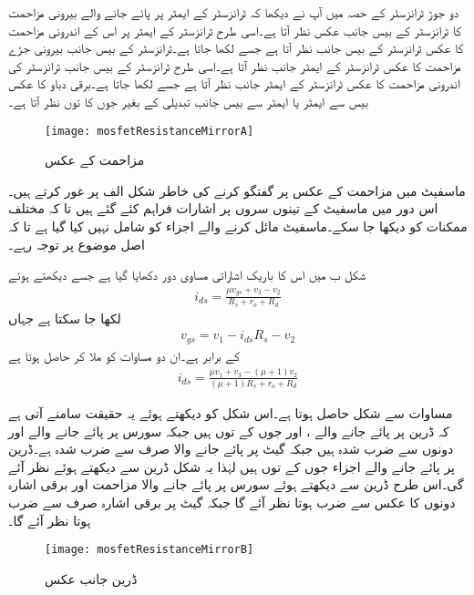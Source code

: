 دو جوڑ ٹرانزسٹر کے حصہ  میں آپ نے دیکھا کہ ٹرانزسٹر کے ایمٹر پر پائے جانے والے بیرونی مزاحمت  کا ٹرانزسٹر کے بیس جانب عکس  نظر آتا ہے۔اسی طرح ٹرانزسٹر کے ایمٹر پر اس کے اندرونی مزاحمت  کا عکس ٹرانزسٹر کے بیس جانب  نظر آتا ہے جسے  لکھا جاتا ہے۔ٹرانزسٹر کے بیس جانب بیرونی جڑے مزاحمت  کا عکس ٹرانزسٹر کے ایمٹر جانب  نظر آتا ہے۔اسی طرح ٹرانزسٹر کے بیس جانب ٹرانزسٹر کی اندرونی مزاحمت  کا عکس ٹرانزسٹر کے ایمٹر  جانب  نظر آتا ہے جسے  لکھا جاتا ہے۔برقی دباو کا عکس بیس سے ایمٹر یا ایمٹر سے بیس جانب تبدیلی کے بغیر جوں کا توں نظر آتا ہے۔
\begin{figure}
\centering
\texttt{[image: mosfetResistanceMirrorA]}
\caption{مزاحمت کے عکس}
\label{شکل_ماسفیٹ_مزاحمت_کے_عکس}
\end{figure}

ماسفیٹ میں مزاحمت کے عکس پر گفتگو کرنے کی خاطر شکل  الف پر غور کرتے ہیں۔اس دور میں ماسفیٹ کے تینوں سروں پر اشارات فراہم کئے گئے ہیں تا کہ مختلف ممکنات کو دیکھا جا سکے۔ماسفیٹ مائل کرنے والے اجزاء کو شامل نہیں کیا گیا ہے تا کہ اصل موضوع پر توجہ رہے۔

شکل  ب میں اس کا باریک اشاراتی مساوی دور دکھایا گیا ہے جسے دیکھتے ہوئے
\begin{align*}
i_{ds}=\frac{\mu v_{gs}+v_3-v_2}{R_s+r_o+R_d}
\end{align*}
لکھا جا سکتا ہے جہاں
\begin{align*}
v_{gs}=v_1-i_{ds} R_s-v_2
\end{align*}
کے برابر ہے۔ان دو مساوات کو ملا کر حاصل ہوتا ہے
\begin{align}\label{مساوات_ماسفیٹ_محاصل_عکس}
i_{ds}=\frac{\mu v_1+v_3-\left(\mu+1 \right) v_2}{\left(\mu+1 \right) R_s+r_o+R_d}
\end{align}

مساوات  سے شکل  حاصل ہوتا ہے۔اس شکل کو دیکھتے ہوئے یہ حقیقت سامنے آتی ہے کہ ڈرین پر پائے جانے والے  ،  اور  جوں کے توں ہیں جبکہ سورس پر پائے جانے والے  اور  دونوں   سے ضرب شدہ ہیں جبکہ گیٹ پر پائے جانے والا  صرف  سے ضرب شدہ ہے۔ڈرین پر پائے جانے والے اجزاء جوں کے توں ہیں لہٰذا یہ شکل ڈرین سے دیکھتے ہوئے نظر آئے گی۔اس طرح ڈرین سے دیکھتے ہوئے سورس پر پائے جانے والا مزاحمت اور برقی اشارہ دونوں  کا عکس  سے ضرب ہوتا نظر آئے گا جبکہ  گیٹ پر برقی اشارہ صرف  سے ضرب ہوتا نظر آئے گا۔ 
%
\begin{figure}
\centering
\texttt{[image: mosfetResistanceMirrorB]}
\caption{ڈرین جانب عکس}
\label{شکل_ماسفیٹ_مزاحمت_کے_عکس_ب}
\end{figure}


